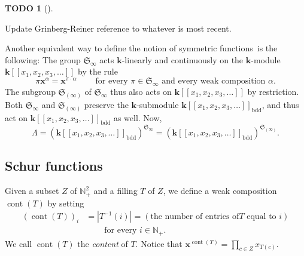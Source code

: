 \documentclass[numbers=enddot,12pt,final,onecolumn,notitlepage]{scrartcl}%
\theoremstyle{definition}
\newtheorem{quest}[theo]{TODO}
\newenvironment{todo}[1][]
{\begin{quest}[#1]\begin{leftbar}}
{\end{leftbar}\end{quest}}
\let\prodnonlimits\prod
\renewcommand{\prod}{\prodnonlimits\limits}
\begin{document}
\begin{todo}
Update Grinberg-Reiner reference to whatever is most recent.
\end{todo}

Another equivalent way to define the notion of symmetric functions\ is the
following: The group $\mathfrak{S}_{\infty}$ acts $\mathbf{k}$-linearly and
continuously on the $\mathbf{k}$-module $\mathbf{k}\left[  \left[  x_{1}%
,x_{2},x_{3},\ldots\right]  \right]  $ by the rule%
\[
\pi\mathbf{x}^{\alpha}=\mathbf{x}^{\pi\cdot\alpha}%
\ \ \ \ \ \ \ \ \ \ \text{for every }\pi\in\mathfrak{S}_{\infty}\text{ and
every weak composition }\alpha\text{.}%
\]
The subgroup $\mathfrak{S}_{\left(  \infty\right)  }$ of $\mathfrak{S}%
_{\infty}$ thus also acts on $\mathbf{k}\left[  \left[  x_{1},x_{2}%
,x_{3},\ldots\right]  \right]  $ by restriction. Both $\mathfrak{S}_{\infty}$
and $\mathfrak{S}_{\left(  \infty\right)  }$ preserve the $\mathbf{k}%
$-submodule $\mathbf{k}\left[  \left[  x_{1},x_{2},x_{3},\ldots\right]
\right]  _{\operatorname*{bdd}}$, and thus act on $\mathbf{k}\left[  \left[
x_{1},x_{2},x_{3},\ldots\right]  \right]  _{\operatorname*{bdd}}$ as well.
Now,%
\[
\Lambda=\left(  \mathbf{k}\left[  \left[  x_{1},x_{2},x_{3},\ldots\right]
\right]  _{\operatorname*{bdd}}\right)  ^{\mathfrak{S}_{\infty}}=\left(
\mathbf{k}\left[  \left[  x_{1},x_{2},x_{3},\ldots\right]  \right]
_{\operatorname*{bdd}}\right)  ^{\mathfrak{S}_{\left(  \infty\right)  }}.
\]


\subsection{Schur functions}

Given a subset $Z$ of $\mathbb{N}_{+}^{2}$ and a filling $T$ of $Z$, we define
a weak composition $\operatorname*{cont}\left(  T\right)  $ by setting%
\begin{align*}
\left(  \operatorname*{cont}\left(  T\right)  \right)  _{i}  &  =\left\vert
T^{-1}\left(  i\right)  \right\vert =\left(  \text{the number of entries of
}T\text{ equal to }i\right) \\
&  \ \ \ \ \ \ \ \ \ \ \text{for every }i\in\mathbb{N}_{+}.
\end{align*}
We call $\operatorname*{cont}\left(  T\right)  $ the \textit{content} of $T$.
Notice that $\mathbf{x}^{\operatorname*{cont}\left(  T\right)  }=\prod_{c\in
Z}x_{T\left(  c\right)  }$.
\end{document}
